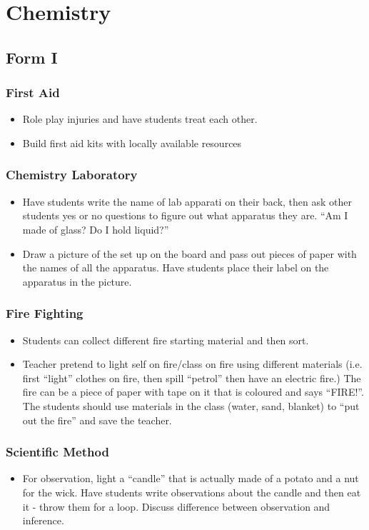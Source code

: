 \section{Chemistry}
\subsection{Form I}
\subsubsection{First Aid}
\begin{itemize}
\item	Role play injuries and have students treat each other.
\item	Build first aid kits with locally available resources
\end{itemize}

\subsubsection{Chemistry Laboratory}
\begin{itemize}
\item	Have students write the name of lab apparati on their back, then ask other students yes or no questions to figure out what apparatus they are. “Am I made of glass? Do I hold liquid?”
\item Draw a picture of the set up on the board and pass out pieces of paper with the names of all the apparatus. Have students place their label on the apparatus in the picture. 
\end{itemize}

\subsubsection{Fire Fighting}
\begin{itemize}
\item	Students can collect different fire starting material and then sort.
\item Teacher pretend to light self on fire/class on fire using different materials (i.e. first ``light'' clothes on fire, then spill ``petrol'' then have an electric fire.) The fire can be a piece of paper with tape on it that is coloured and says ``FIRE!''. The students should use materials in the class (water, sand, blanket) to ``put out the fire'' and save the teacher.
\end{itemize}

\subsubsection{Scientific Method}
\begin{itemize}
\item	For observation, light a ``candle'' that is actually made of a potato and a nut for the wick. Have students write observations about the candle and then eat it - throw them for a loop. Discuss difference between observation and inference.
\end{itemize}

